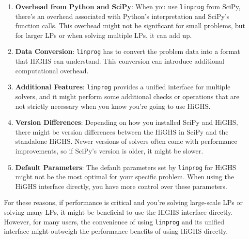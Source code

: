 \begin{enumerate}
    \item \textbf{Overhead from Python and SciPy}: When you use \texttt{linprog} from SciPy,
     there's an overhead associated with Python's interpretation and SciPy's function calls.
      This overhead might not be significant for small problems, but for larger LPs or when solving multiple LPs, it can add up.
    
    \item \textbf{Data Conversion}: \texttt{linprog} has to convert the problem data
     into a format that HiGHS can understand. This conversion can introduce additional computational overhead.
    
    \item \textbf{Additional Features}: \texttt{linprog} provides a unified interface for
     multiple solvers, and it might perform some additional checks or operations that are not strictly necessary
      when you know you're going to use HiGHS.
    
    \item \textbf{Version Differences}: Depending on how you installed SciPy and HiGHS,
     there might be version differences between the HiGHS in SciPy and the standalone HiGHS. 
     Newer versions of solvers often come with performance improvements, so if SciPy's version is older, it might be slower.
    
    \item \textbf{Default Parameters}: The default parameters set by \texttt{linprog} for HiGHS 
    might not be the most optimal for your specific problem. When using the HiGHS interface directly, 
    you have more control over these parameters.
\end{enumerate}

For these reasons, if performance is critical and you're solving large-scale LPs or solving many LPs, it might be beneficial to use 
the HiGHS interface directly. However, for many users, the convenience of using
 \texttt{linprog} and its unified interface might outweigh the performance benefits of using HiGHS directly.

